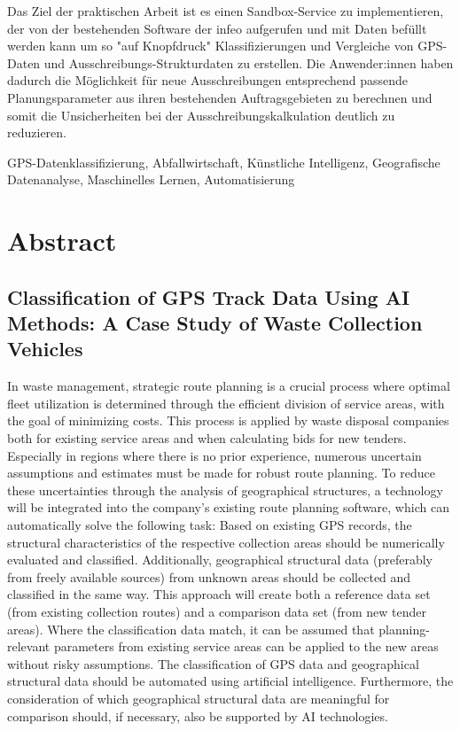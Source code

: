 \documentclass[a4paper,12pt,twoside]{scrreprt}
\begin{document}
Das Ziel der praktischen Arbeit ist es einen Sandbox-Service zu implementieren,
der von der bestehenden Software der infeo aufgerufen und mit Daten befüllt
werden kann um so "auf Knopfdruck" Klassifizierungen und Vergleiche von
GPS-Daten und Ausschreibungs-Strukturdaten zu erstellen. Die Anwender:innen
haben dadurch die Möglichkeit für neue Ausschreibungen entsprechend passende
Planungsparameter aus ihren bestehenden Auftragsgebieten zu berechnen und somit
die Unsicherheiten bei der Ausschreibungskalkulation deutlich zu reduzieren.

\vspace{0.5cm}

\noindent
GPS-Datenklassifizierung, Abfallwirtschaft, Künstliche Intelligenz,
Geografische Datenanalyse, Maschinelles Lernen, Automatisierung

\newpage
\section*{Abstract}
\subsection*{Classification of GPS Track Data Using AI Methods: A Case Study of
  Waste Collection Vehicles}

In waste management, strategic route planning is a crucial process where
optimal fleet utilization is determined through the efficient division of
service areas, with the goal of minimizing costs. This process is applied by
waste disposal companies both for existing service areas and when calculating
bids for new tenders. Especially in regions where there is no prior experience,
numerous uncertain assumptions and estimates must be made for robust route
planning. To reduce these uncertainties through the analysis of geographical
structures, a technology will be integrated into the company’s existing route
planning software, which can automatically solve the following task: Based on
existing GPS records, the structural characteristics of the respective
collection areas should be numerically evaluated and classified. Additionally,
geographical structural data (preferably from freely available sources) from
unknown areas should be collected and classified in the same way. This approach
will create both a reference data set (from existing collection routes) and a
comparison data set (from new tender areas). Where the classification data
match, it can be assumed that planning-relevant parameters from existing
service areas can be applied to the new areas without risky assumptions. The
classification of GPS data and geographical structural data should be automated
using artificial intelligence. Furthermore, the consideration of which
geographical structural data are meaningful for comparison should, if
necessary, also be supported by AI technologies.
\end{document}
